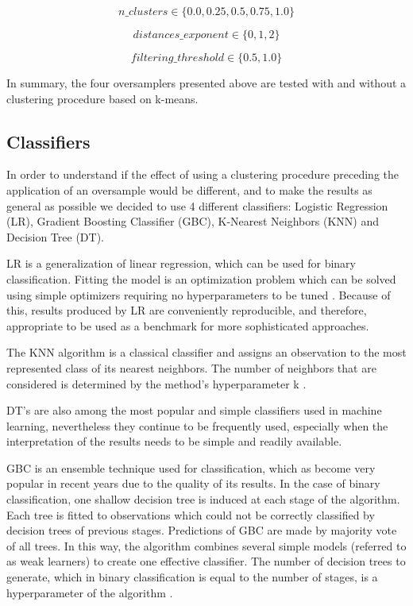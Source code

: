 \documentclass[parskip=full]{scrartcl}
\begin{document}
$$n\_clusters \in \{0.0, 0.25,0.5,0.75, 1.0\}$$

$$distances\_exponent \in \{0, 1, 2\}$$

$$filtering\_threshold \in \{0.5, 1.0\}$$

In summary, the four oversamplers presented above are tested with and without a
clustering procedure based on k-means.

\subsection{Classifiers}

In order to understand if the effect of using a clustering procedure preceding
the application of an oversample would be different, and to make the results as
general as possible we decided to use 4 different classifiers: Logistic
Regression (LR), Gradient Boosting Classifier (GBC), K-Nearest Neighbors (KNN)
and Decision Tree (DT).

LR is a generalization of linear regression, which can be used for binary
classification. Fitting the model is an optimization problem which can be solved
using simple optimizers requiring no hyperparameters to be tuned
\cite{McCullagh1989}. Because of this, results produced by LR are conveniently
reproducible, and therefore, appropriate to be used as a benchmark for more
sophisticated approaches.

The KNN algorithm is a classical classifier and assigns an observation to the
most represented class of its nearest neighbors. The number of neighbors that
are considered is determined by the method’s hyperparameter k \cite{Fix1989}.

DT’s \cite{Breiman1984} are also among the most popular and simple classifiers
used in machine learning, nevertheless they continue to be frequently used,
especially when the interpretation of the results needs to be simple and readily
available.

GBC is an ensemble technique used for classification, which as become very
popular in recent years due to the quality of its results. In the case of binary
classification, one shallow decision tree is induced at each stage of the
algorithm. Each tree is fitted to observations which could not be correctly
classified by decision trees of previous stages. Predictions of GBC are made by
majority vote of all trees. In this way, the algorithm combines several simple
models (referred to as weak learners) to create one effective classifier. The
number of decision trees to generate, which in binary classification is equal to
the number of stages, is a hyperparameter of the algorithm \cite{Friedman2001}.
\end{document}
